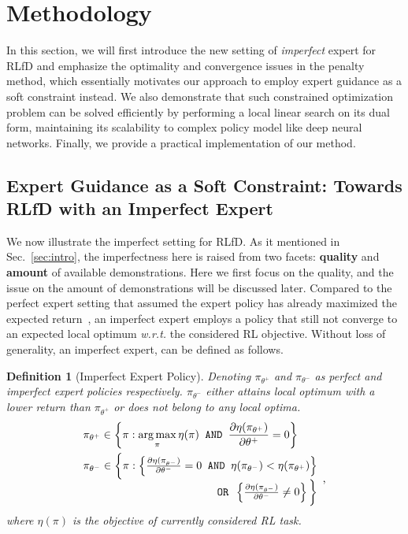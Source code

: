 \documentclass[letterpaper]{article} %
\newtheorem{definition}{Definition}
\DeclareMathOperator*{\argmax}{arg\,max}
\begin{document}
\section{Methodology}\label{sec:method}
In this section, we will first introduce the new setting of \emph{imperfect} expert for RLfD and emphasize the optimality and convergence issues in the penalty method, which essentially motivates our approach to employ expert guidance as a soft constraint instead. We also demonstrate that such constrained optimization problem can be solved efficiently by performing a local linear search on its dual form, maintaining its scalability to complex policy model like deep neural networks. Finally, we provide a practical implementation of our method.

\subsection{Expert Guidance as a Soft Constraint: Towards RLfD with an Imperfect Expert}\label{sec:soft_constraint}
We now illustrate the imperfect setting for RLfD. As it mentioned in Sec.~\ref{sec:intro}, the imperfectness here is raised from two facets: \textbf{quality} and \textbf{amount} of available demonstrations. Here we first focus on the quality, and the issue on the amount of demonstrations will be discussed later. Compared to the perfect expert setting that assumed the expert policy has already maximized the expected return~\cite{ijcaipofd1,pofd}, an imperfect expert employs a policy that still not converge to an expected local optimum \emph{w.r.t.} the considered RL objective. Without
loss of generality, an imperfect expert, can be defined as follows.
\begin{definition}[Imperfect Expert Policy]\label{def:imperfect}
Denoting $\pi_{\theta^{+}}$ and $\pi_{\theta^{-}}$ as perfect and imperfect expert policies respectively. $\pi_{\theta^{-}}$ either attains local optimum with a lower return than $\pi_{\theta^{+}}$ or does not belong to any local optima.
\begin{align}
    &\pi_{\theta^{+}} \in \left\{\pi: \argmax_\pi \eta(\pi)\texttt{\ AND\ }\frac{\partial \eta(\pi_{\theta^{+}})}{\partial\theta^+} = 0\right\}  \nonumber\\
    &\begin{array}{ @{} r l @{} }
    \pi_{\theta^{-}} \in \bigg\{\pi : \left\{\frac{\partial\eta(\pi_{\theta^{-}})}{\partial\theta^-} = 0\texttt{\ AND\ }\eta(\pi_{\theta^{-}}) < \eta(\pi_{\theta^{+}})\right\} \\
    \texttt{\ OR\ }\left\{\frac{\partial\eta(\pi_{\theta^{-}})}{\partial\theta^-} \neq 0\right\}\bigg\}\end{array}\text{,}\nonumber
\end{align}
where $\eta(\pi)$ is the objective of currently considered RL task.
\end{definition}
\end{document}
